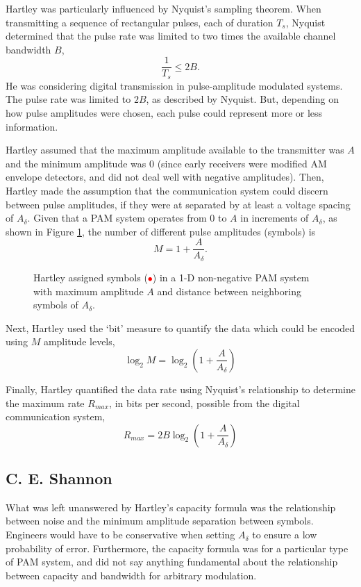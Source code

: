 Hartley was particularly influenced by Nyquist's sampling theorem.  When transmitting a sequence of rectangular pulses, each of duration $T_s$, Nyquist determined that the pulse rate was limited to two times the available channel bandwidth $B$,
\[
  \frac{1}{T_s} \le 2B.
\]
He was considering digital transmission in pulse-amplitude modulated systems.  The pulse rate was limited to $2B$, as described by Nyquist.  But, depending on how pulse amplitudes were chosen, each pulse could represent more or less information.

Hartley assumed that the maximum amplitude available
to the transmitter was $A$ and the minimum amplitude was $0$ (since early receivers were modified AM envelope detectors, and
did not deal well with negative amplitudes).  Then, Hartley made the assumption that
the communication system could discern between pulse amplitudes, if
they were at separated by at least a voltage spacing of $A_\delta$.
Given that a PAM system operates from $0$ to $A$ in increments of
$A_\delta$, as shown in Figure \ref{F:Channel-coding-Hartley}, the number of different pulse amplitudes (symbols) is
\[
  M = 1 + \frac{A}{A_\delta}.
\]

\begin{figure}[htbp]
  \centering{
    
  }
  \caption{Hartley assigned symbols (\textcolor{red}{$\bullet$}) in a 1-D non-negative PAM system with maximum amplitude $A$ and distance between neighboring symbols of $A_\delta$.}
  \label{F:Channel-coding-Hartley}
\end{figure}


Next, Hartley used the `bit' measure to quantify the data which
could be encoded using $M$ amplitude levels,
\[
  \log_2 M =  \log_2 \left( 1 + \frac{A}{A_\delta} \right)
\]

Finally, Hartley quantified the data rate using Nyquist's
relationship to determine the maximum rate $R_{max}$, in bits per second,
possible from the digital communication system,
\[
  R_{max} =  2B \log_2 \left( 1 + \frac{A}{A_\delta} \right)
\]


\subsection{C. E. Shannon}

What was left unanswered by Hartley's capacity formula was the relationship between noise and the minimum amplitude separation between symbols.  Engineers would have to be conservative when setting $A_\delta$ to ensure a low probability of error.  Furthermore, the capacity formula was for a particular type of PAM system, and did not say anything fundamental about the relationship between capacity and bandwidth for arbitrary modulation.

